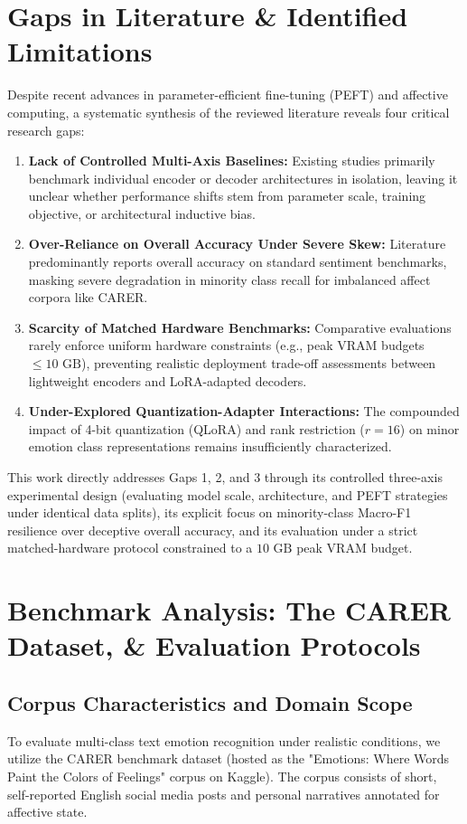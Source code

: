 \documentclass[conference]{IEEEtran}
\begin{document}
\section{Gaps in Literature \& Identified Limitations}
\label{sec:gaps}

Despite recent advances in parameter-efficient fine-tuning (PEFT) and affective computing, a systematic synthesis of the reviewed literature reveals four critical research gaps:

\begin{enumerate}
    \item \textbf{Lack of Controlled Multi-Axis Baselines:} Existing studies primarily benchmark individual encoder or decoder architectures in isolation, leaving it unclear whether performance shifts stem from parameter scale, training objective, or architectural inductive bias.
    \item \textbf{Over-Reliance on Overall Accuracy Under Severe Skew:} Literature predominantly reports overall accuracy on standard sentiment benchmarks, masking severe degradation in minority class recall for imbalanced affect corpora like CARER.
    \item \textbf{Scarcity of Matched Hardware Benchmarks:} Comparative evaluations rarely enforce uniform hardware constraints (e.g., peak VRAM budgets $\le 10\text{ GB}$), preventing realistic deployment trade-off assessments between lightweight encoders and LoRA-adapted decoders.
    \item \textbf{Under-Explored Quantization-Adapter Interactions:} The compounded impact of 4-bit quantization (QLoRA) and rank restriction ($r=16$) on minor emotion class representations remains insufficiently characterized.
\end{enumerate}

\noindent This work directly addresses Gaps 1, 2, and 3 through its controlled three-axis experimental design (evaluating model scale, architecture, and PEFT strategies under identical data splits), 
its explicit focus on minority-class Macro-F1 resilience over deceptive overall accuracy, and its evaluation under a strict matched-hardware protocol 
constrained to a $10\text{ GB}$ peak VRAM budget.

\section{Benchmark Analysis: The CARER Dataset, \& Evaluation Protocols}
\label{sec:ejeC}

\subsection{Corpus Characteristics and Domain Scope}
To evaluate multi-class text emotion recognition under realistic conditions, we utilize the CARER benchmark dataset (hosted as the "Emotions: Where Words Paint the Colors of Feelings" corpus on Kaggle). The corpus consists of short, self-reported English social media posts and personal narratives annotated for affective state.
\end{document}
